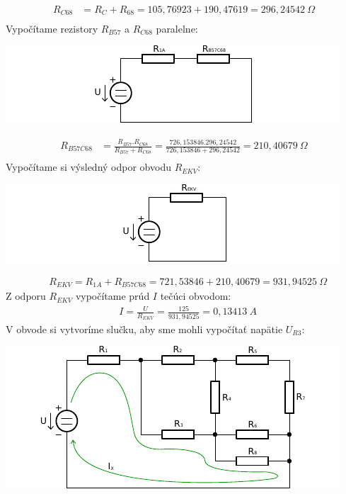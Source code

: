 \begin{align*}
    R_{C68} &= R_{C} + R_{68} = 105,76923 + 190,47619 = 296,24542~\Omega \\
\end{align*}
Vypočítame rezistory $R_{B57}$ a $R_{C68}$ paralelne:
\begin{center}
  \includegraphics[width=0.8\columnwidth,keepaspectratio]{res/u1o5}
\end{center}
\begin{align*}
    R_{B57C68} &= \frac{R_{B57}.R_{C68}}{R_{B57} + R_{C68}} =
        \frac{726,153846.296,24542}{726,153846 + 296,24542} = 210,40679~\Omega \\
\end{align*}
Vypočítame si výsledný odpor obvodu $R_{EKV}$:
\begin{center}
  \includegraphics[width=0.8\columnwidth,keepaspectratio]{res/u1o6}
\end{center}
\begin{align*}
    &R_{EKV} = R_{1A} + R_{B57C68} = 721,53846 + 210,40679 = 931,94525~\Omega
\end{align*}
Z odporu $R_{EKV}$ vypočítame prúd $I$ tečúci obvodom:
\begin{align*}
    &I = \frac{U}{R_{EKV}} = \frac{125}{931,94525} = 0,13413~A
\end{align*}
\newpage
V obvode si vytvoríme slučku, aby sme mohli vypočítať napätie $U_{R3}$:
\begin{center}
  \includegraphics[width=0.8\columnwidth,keepaspectratio]{res/u1o7}
\end{center}
